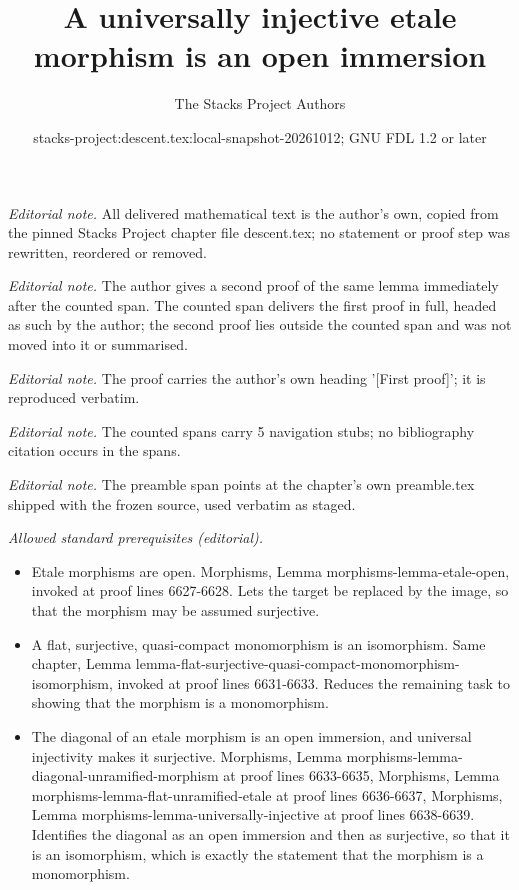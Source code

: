 \documentclass{stacks-project}
\title{A universally injective etale morphism is an open immersion}
\author{The Stacks Project Authors}
\date{stacks-project:descent.tex:local-snapshot-20261012; GNU FDL 1.2 or later}
\theoremstyle{plain}
\theoremstyle{definition}
\theoremstyle{remark}
\numberwithin{equation}{subsection}
\begin{document}
\maketitle
\noindent\textit{Editorial note.} All delivered mathematical text is the author's own, copied from the pinned Stacks Project chapter file descent.tex; no statement or proof step was rewritten, reordered or removed.\par\medskip
\noindent\textit{Editorial note.} The author gives a second proof of the same lemma immediately after the counted span. The counted span delivers the first proof in full, headed as such by the author; the second proof lies outside the counted span and was not moved into it or summarised.\par\medskip
\noindent\textit{Editorial note.} The proof carries the author's own heading '[First proof]'; it is reproduced verbatim.\par\medskip
\noindent\textit{Editorial note.} The counted spans carry 5 navigation stubs; no bibliography citation occurs in the spans.\par\medskip
\noindent\textit{Editorial note.} The preamble span points at the chapter's own preamble.tex shipped with the frozen source, used verbatim as staged.\par\medskip
\noindent\textit{Allowed standard prerequisites (editorial).}\begin{itemize}
\item Etale morphisms are open. Morphisms, Lemma morphisms-lemma-etale-open, invoked at proof lines 6627-6628. Lets the target be replaced by the image, so that the morphism may be assumed surjective.
\item A flat, surjective, quasi-compact monomorphism is an isomorphism. Same chapter, Lemma lemma-flat-surjective-quasi-compact-monomorphism-isomorphism, invoked at proof lines 6631-6633. Reduces the remaining task to showing that the morphism is a monomorphism.
\item The diagonal of an etale morphism is an open immersion, and universal injectivity makes it surjective. Morphisms, Lemma morphisms-lemma-diagonal-unramified-morphism at proof lines 6633-6635, Morphisms, Lemma morphisms-lemma-flat-unramified-etale at proof lines 6636-6637, Morphisms, Lemma morphisms-lemma-universally-injective at proof lines 6638-6639. Identifies the diagonal as an open immersion and then as surjective, so that it is an isomorphism, which is exactly the statement that the morphism is a monomorphism.
\end{itemize}\medskip
\end{document}

